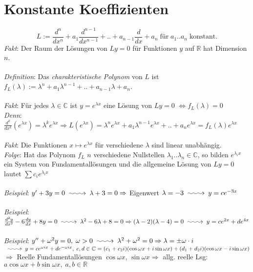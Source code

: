 \documentclass[12pt,a4paper,titlepage]{article}
\makeatletter
\newcommand{\longsquiggly}{\xymatrix{{}\ar@{~>}[r]&{}}}
\makeatother
\begin{document}
\section*{Konstante Koeffizienten}
$$L:=\frac{d^n}{dx^n}+a_1\frac{d^{n-1}}{dx^{n-1}}+..+a_{n-1}\frac{d}{dx}+a_n \;\text{für}\; a_1..a_n \;\text{konstant.}$$
\textit{Fakt}: Der Raum der Lösungen von $Ly=0$ für Funktionen $y$ auf $\mathbb{R}$ hat Dimension $n$.\\
\\
\textit{Definition}: Das \emph{charakteristische Polynom} von $L$ ist $f_L(\lambda):=\lambda^n+a_1\lambda^{n-1}+..+a_{n-1}\lambda+a_n$. \\
\\
\textit{Fakt}: Für jedes $\lambda\in\mathbb{C}$ ist $y=e^{\lambda x}$ eine Lösung von $Ly=0$ $\iff f_L(\lambda)=0$ \\
\textit{Denn}: $\frac{d^k}{dx^k}(e^{\lambda x})=\lambda^k e^{\lambda x} \Rightarrow L(e^{\lambda x})=\lambda^ne^{\lambda x}+a_1\lambda^{n-1}e^{\lambda x}+..+a_ne^{\lambda x}=f_L(\lambda)e^{\lambda x}$ \\
\\
\textit{Fakt}: Die Funktionen $x\mapsto e^{\lambda x}$ für verschiedene $\lambda$ sind linear unabhängig. \\
\textit{Folge}: Hat das Polynom $f_L$ $n$ verschiedene Nullstellen $\lambda_1..\lambda_n\in\mathbb{C}$, so bilden $e^{\lambda_i x}$ ein System von Fundamentallösungen und die allgemeine Lösung von $Ly=0$ lautet $\sum c_ie^{\lambda_i x}$ \\
\\
\textit{Beispiel}: $y'+3y=0 \longsquiggly \lambda+3=0 \Rightarrow $ Eigenwert $\lambda=-3 \longsquiggly y=ce^{-3x}$\\
\\
\textit{Beispiel}: $\frac{d^2y}{dx^2}-6\frac{dy}{dx}+8y=0 \longsquiggly \lambda^2-6\lambda+8=0 \Rightarrow (\lambda-2)(\lambda-4)=0 \longsquiggly y=ce^{2x}+de^{4x}$ \\
\\
\textit{Beispiel}: $y''+\omega^2y=0,\;\omega>0 \longsquiggly \lambda^2+\omega^2=0 \Rightarrow \lambda=\pm\omega\cdot i$ \\
$\longsquiggly y=ce^{\omega ix}+de^{-\omega ix},\; c,d\in\mathbb{C} = (c_1+c_2i)(\cos\omega x+i\sin\omega x)+(d_1+d_2i)(\cos\omega x-i\sin\omega x)$ \\
$\Rightarrow$ Reelle Fundamentallösungen $\cos\omega x$, $\sin\omega x \Rightarrow $ allg. reelle Lsg: $a\cos\omega x+b\sin\omega x,\; a,b\in\mathbb{R}$ \\
\end{document}
